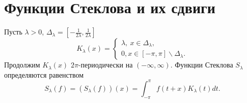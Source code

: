\section{Функции Стеклова и их сдвиги}




Пусть $\lambda>0$, $\Delta_\lambda=[-\frac1{2\lambda},\frac1{2\lambda}]$
$$K_\lambda(x)=\begin{cases}\lambda,\ x\in\Delta_\lambda,\\0,x\in[-\pi,\pi]\backslash\Delta_\lambda.\end{cases}$$
Продолжим $K_\lambda(x)$ $2\pi$-периодически на $(-\infty,\infty)$. Функции Стеклова $S_\lambda$ определяются равенством
\begin{equation}\label{Steklov}
  S_\lambda(f)=(S_\lambda(f))(x)=\int_{-\pi}^{\pi}f(t+x)K_\lambda(t)dt.
\end{equation}


